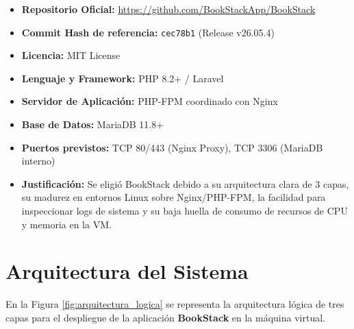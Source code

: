 \documentclass[12pt,a4paper]{article}
\begin{document}
\begin{itemize}
    \item \textbf{Repositorio Oficial:} \url{https://github.com/BookStackApp/BookStack}
    \item \textbf{Commit Hash de referencia:} \texttt{cec78b1} (Release v26.05.4)
    \item \textbf{Licencia:} MIT License
    \item \textbf{Lenguaje y Framework:} PHP 8.2+ / Laravel
    \item \textbf{Servidor de Aplicación:} PHP-FPM coordinado con Nginx
    \item \textbf{Base de Datos:} MariaDB 11.8+
    \item \textbf{Puertos previstos:} TCP 80/443 (Nginx Proxy), TCP 3306 (MariaDB interno)
    \item \textbf{Justificación:} Se eligió BookStack debido a su arquitectura clara de 3 capas, su madurez en entornos Linux sobre Nginx/PHP-FPM, la facilidad para inspeccionar logs de sistema y su baja huella de consumo de recursos de CPU y memoria en la VM.
\end{itemize}

\section{Arquitectura del Sistema}

En la Figura \ref{fig:arquitectura_logica} se representa la arquitectura lógica de tres capas para el despliegue de la aplicación \textbf{BookStack} en la máquina virtual.
\end{document}
